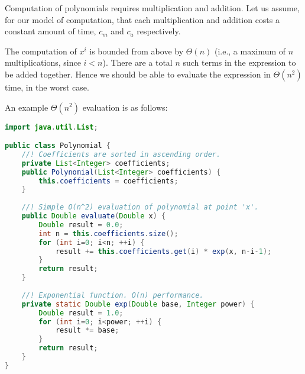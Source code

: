 \documentclass[a4paper,12pt]{article}
\begin{document}

Computation of polynomials requires multiplication and addition. Let us assume, for our model of computation, that each multiplication and addition costs a constant amount of time, $c_m$ and $c_a$ respectively. 

The computation of $x^i$ is bounded from above by $\Theta(n)$  (i.e., a maximum of $n$ multiplications, since $i < n$). There are a total $n$ such terms in the expression to be added together. Hence we should
be able to evaluate the expression in $\Theta(n^2)$ time, in the worst case. 

An example $\Theta(n^2)$ evaluation is as follows:

\begin{lstlisting}[language=Java]
import java.util.List;

public class Polynomial {
    //! Coefficients are sorted in ascending order.
    private List<Integer> coefficients;
    public Polynomial(List<Integer> coefficients) {
        this.coefficients = coefficients;
    }
    
    //! Simple O(n^2) evaluation of polynomial at point 'x'.
    public Double evaluate(Double x) {
        Double result = 0.0;
        int n = this.coefficients.size();
        for (int i=0; i<n; ++i) {
            result += this.coefficients.get(i) * exp(x, n-i-1);
        }
        return result;
    }
    
    //! Exponential function. O(n) performance.
    private static Double exp(Double base, Integer power) {
        Double result = 1.0;
        for (int i=0; i<power; ++i) {
            result *= base;
        }
        return result;
    }
}

\end{lstlisting}
\end{document}
